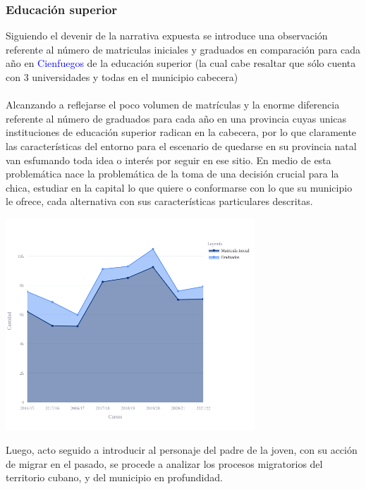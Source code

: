\documentclass{article}
\begin{document}
\subsubsection{Educación superior}
Siguiendo el devenir de la narrativa expuesta se introduce una observación referente al número de matriculas iniciales y graduados en comparación para cada año en \textcolor{blue}{Cienfuegos} de la educación superior (la cual cabe resaltar que sólo cuenta con 3 universidades y todas en el municipio cabecera)\\\\
Alcanzando a reflejarse el poco volumen de matrículas y la enorme diferencia referente al número de graduados para cada año en una provincia cuyas unicas instituciones de educación superior radican en la cabecera, por lo que claramente las características del entorno para el escenario de quedarse en su provincia natal van esfumando toda idea o interés por seguir en ese sitio.
En medio de esta problemática nace la problemática de la toma de una decisión crucial para la chica, estudiar en la capital lo que quiere o conformarse con lo que su municipio le ofrece, cada alternativa con sus características particulares descritas.
\begin{center}
\includegraphics[width=0.7\textwidth]{img/fig2.png}
\end{center}
Luego, acto seguido a introducir al personaje del padre de la joven, con su acción de migrar en el pasado, se procede a analizar los procesos migratorios del territorio cubano, y del municipio en profundidad.
\end{document}
